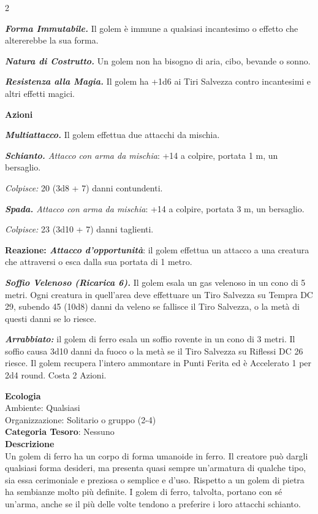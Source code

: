 \begin{multicols}{2}
{\emph{\textbf{Forma Immutabile.}} Il golem è immune a qualsiasi incantesimo o effetto che altererebbe la sua forma.

\emph{\textbf{Natura di Costrutto.}} Un golem non ha bisogno di aria, cibo, bevande o sonno.

\emph{\textbf{Resistenza alla Magia.}} Il golem ha +1d6 ai Tiri Salvezza contro incantesimi e altri effetti magici.

\textbf{Azioni}

\emph{\textbf{Multiattacco.}} Il golem effettua due attacchi da mischia.

\emph{\textbf{Schianto.} Attacco con arma da mischia}: +14 a colpire, portata 1 m, un bersaglio.

\emph{Colpisce:} 20 (3d8 + 7) danni contundenti.

\emph{\textbf{Spada.} Attacco con arma da mischia}: +14 a colpire, portata 3 m, un bersaglio.

\emph{Colpisce:} 23 (3d10 + 7) danni taglienti.

\textbf{Reazione: \emph{Attacco d'opportunità}}: il golem effettua un attacco a una creatura che attraversi o esca dalla sua portata di 1 metro.

\emph{\textbf{Soffio Velenoso (Ricarica 6).}} Il golem esala un gas velenoso in un cono di 5 metri. Ogni creatura in quell'area deve effettuare un Tiro Salvezza su Tempra DC 29, subendo 45 (10d8) danni da veleno se fallisce il Tiro Salvezza, o la metà di questi danni se lo riesce.

\emph{\textbf{Arrabbiato:}} il golem di ferro esala un soffio rovente in un cono di 3 metri. Il soffio causa 3d10 danni da fuoco o la metà se il Tiro Salvezza su Riflessi DC 26 riesce. Il golem recupera l'intero ammontare in Punti Ferita ed è Accelerato 1 per 2d4 round. Costa 2 Azioni.

\textbf{Ecologia}\\
Ambiente: Qualsiasi\\
Organizzazione: Solitario o gruppo (2-4)\\
\textbf{Categoria Tesoro}: Nessuno\\
\textbf{Descrizione}\\
Un golem di ferro ha un corpo di forma umanoide in ferro. Il creatore può dargli qualsiasi forma desideri, ma presenta quasi sempre un'armatura di qualche tipo, sia essa cerimoniale e preziosa o semplice e d'uso. Rispetto a un golem di pietra ha sembianze molto più definite. I golem di ferro, talvolta, portano con sé un'arma, anche se il più delle volte tendono a preferire i loro attacchi schianto.

}
\end{multicols}
